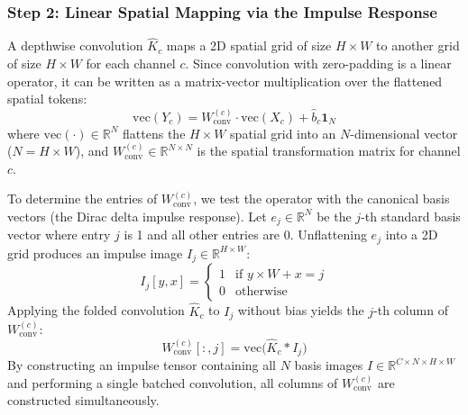 \subsubsection{Step 2: Linear Spatial Mapping via the Impulse Response}
A depthwise convolution $\widehat{K}_c$ maps a 2D spatial grid of size $H \times W$ to another grid of size $H \times W$ for each channel $c$. Since convolution with zero-padding is a linear operator, it can be written as a matrix-vector multiplication over the flattened spatial tokens:
\begin{equation}
    \text{vec}(Y_c) = W_{\text{conv}}^{(c)} \cdot \text{vec}(X_c) + \widehat{b}_c \mathbf{1}_N
\end{equation}
where $\text{vec}(\cdot) \in \mathbb{R}^N$ flattens the $H \times W$ spatial grid into an $N$-dimensional vector ($N = H \times W$), and $W_{\text{conv}}^{(c)} \in \mathbb{R}^{N \times N}$ is the spatial transformation matrix for channel $c$.

To determine the entries of $W_{\text{conv}}^{(c)}$, we test the operator with the canonical basis vectors (the Dirac delta impulse response). Let $e_j \in \mathbb{R}^N$ be the $j$-th standard basis vector where entry $j$ is 1 and all other entries are 0. Unflattening $e_j$ into a 2D grid produces an impulse image $I_j \in \mathbb{R}^{H \times W}$:
\begin{equation}
    I_j[y, x] = 
    \begin{cases}
        1 & \text{if } y \times W + x = j \\
        0 & \text{otherwise}
    \end{cases}
\end{equation}
Applying the folded convolution $\widehat{K}_c$ to $I_j$ without bias yields the $j$-th column of $W_{\text{conv}}^{(c)}$:
\begin{equation}
    W_{\text{conv}}^{(c)}[:, j] = \text{vec}\Big( \widehat{K}_c * I_j \Big)
\end{equation}
By constructing an impulse tensor containing all $N$ basis images $I \in \mathbb{R}^{C \times N \times H \times W}$ and performing a single batched convolution, all columns of $W_{\text{conv}}^{(c)}$ are constructed simultaneously.

